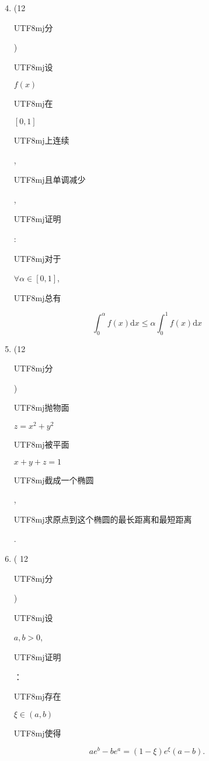\documentclass[10pt]{article}
\begin{document}
\begin{enumerate}
  \setcounter{enumi}{3}
  \item (12 \begin{CJK}{UTF8}{mj}分\end{CJK}) \begin{CJK}{UTF8}{mj}设\end{CJK} $f(x)$ \begin{CJK}{UTF8}{mj}在\end{CJK} $[0,1]$ \begin{CJK}{UTF8}{mj}上连续\end{CJK}, \begin{CJK}{UTF8}{mj}且单调减少\end{CJK}, \begin{CJK}{UTF8}{mj}证明\end{CJK}: \begin{CJK}{UTF8}{mj}对于\end{CJK} $\forall \alpha \in[0,1]$, \begin{CJK}{UTF8}{mj}总有\end{CJK}
\end{enumerate}
$$
\int_{0}^{\alpha} f(x) \mathrm{d} x \leqslant \alpha \int_{0}^{1} f(x) \mathrm{d} x
$$

\begin{enumerate}
  \setcounter{enumi}{4}
  \item (12 \begin{CJK}{UTF8}{mj}分\end{CJK}) \begin{CJK}{UTF8}{mj}抛物面\end{CJK} $z=x^{2}+y^{2}$ \begin{CJK}{UTF8}{mj}被平面\end{CJK} $x+y+z=1$ \begin{CJK}{UTF8}{mj}截成一个椭圆\end{CJK}, \begin{CJK}{UTF8}{mj}求原点到这个椭圆的最长距离和最短距离\end{CJK}.

  \item ( 12 \begin{CJK}{UTF8}{mj}分\end{CJK}) \begin{CJK}{UTF8}{mj}设\end{CJK} $a, b>0$, \begin{CJK}{UTF8}{mj}证明\end{CJK}：\begin{CJK}{UTF8}{mj}存在\end{CJK} $\xi \in(a, b)$ \begin{CJK}{UTF8}{mj}使得\end{CJK}

\end{enumerate}
$$
a e^{b}-b e^{a}=(1-\xi) e^{\xi}(a-b) .
$$
\end{document}
